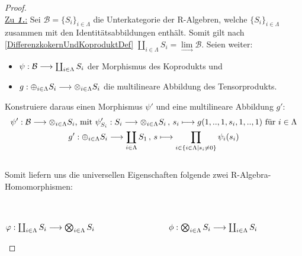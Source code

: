 \documentclass[10pt,a4paper]{report}
\newcommand{\functionfront}[3]{\nolinebreak{#1:#2 \longrightarrow #3}}
\newcommand{\function}[5]{\nolinebreak{#1:#2 \longrightarrow #3 \, , \, #4 \longmapsto #5}}
\newcommand{\colimes}[0]{\lim\limits_{ \longrightarrow }}
\begin{document}
\begin{proof} \ \\
\underline{Zu \textit{\textbf{1.}}:} Sei $\mathcal{B} = \lbrace S_i \rbrace_{i \in \Lambda}$ die Unterkategorie der R-Algebren, welche $\lbrace S_i \rbrace_{i \in \Lambda}$ zusammen mit den Identitätsabbildungen enthält. Somit gilt nach \cref{DifferenzkokernUndKoproduktDef} $\coprod_{i \in \Lambda} S_i = \colimes \mathcal{B}$. Seien weiter:
\begin{itemize}
\item[]$\functionfront{\psi}{\mathcal{B}}{\coprod_{i \in \Lambda} S_i}$ der Morphismus des Koprodukts und
\item[]$\functionfront{g}{\oplus_{i \in \Lambda} S_i}{\otimes_{i \in \Lambda} S_i}$ die multilineare Abbildung des Tensorprodukts.
\end{itemize}
Konstruiere daraus einen Morphismus $\psi'$ und eine multilineare Abbildung $g'$:
\begin{gather*}
\functionfront{\psi'}{\mathcal{B}}{\otimes_{i \in \Lambda} S_i} \text{, mit } \function{\psi'_{S_i}}{S_i}{\otimes_{i \in \Lambda} S_i}{s_i}{g(1,..,1,s_i,1,..,1)} \text{ für } i \in \Lambda\\
\function{g'}{\oplus_{i \in \Lambda} S_i}{\coprod_{i \in \Lambda} S_1}{s}{\prod_{i \in \lbrace i \in \Lambda \vert s_i \neq 0 \rbrace} \psi_i(s_i)}
\end{gather*}
\ \\
Somit liefern uns die universellen Eigenschaften folgende zwei R-Algebra-Homomorphismen:
\begin{center}
\ \\
\ \\
$\functionfront{\varphi}{\coprod_{i \in \Lambda} S_i}{\bigotimes_{i \in \Lambda} S_i} \hspace{9 em} \functionfront{\phi}{\bigotimes_{i \in \Lambda} S_i}{\coprod_{i \in \Lambda} S_i}$
\end{center}

\end{proof}
\end{document}
